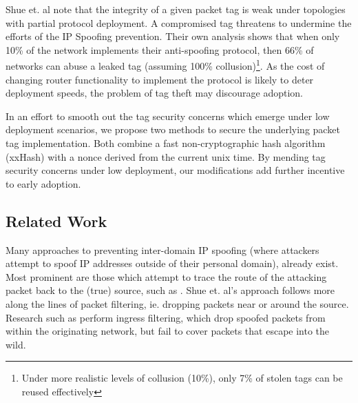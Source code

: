 \documentclass[12pt]{article} %
\begin{document}
Shue et. al note that the integrity of a given packet tag is weak under topologies with partial protocol deployment. A compromised tag threatens to undermine the efforts of the IP Spoofing prevention. Their own analysis shows that when only 10\% of the network implements their anti-spoofing protocol, then 66\% of networks can abuse a leaked tag (assuming 100\% collusion)\cite{Shue20081567}\footnote{Under more realistic levels of collusion (10\%), only 7\% of stolen tags can be reused effectively}. As the cost of changing router functionality to implement the protocol is likely to deter deployment speeds, the problem of tag theft may discourage adoption.

In an effort to smooth out the tag security concerns which emerge under low deployment scenarios, we propose two methods to secure the underlying packet tag implementation. Both combine a fast non-cryptographic hash algorithm (xxHash) with a nonce derived from the current unix time. By mending tag security concerns under low deployment, our modifications add further incentive to early adoption.

\subsection{Related Work}
Many approaches to preventing inter-domain IP spoofing (where attackers attempt to spoof IP addresses outside of their personal domain), already exist. Most prominent are those which attempt to trace the route of the attacking packet back to the (true) source, such as \cite{Taylor}. Shue et. al's approach follows more along the lines of packet filtering, ie. dropping packets near or around the source. Research such as \cite{rfc2827} perform ingress filtering, which drop spoofed packets from within the originating network, but fail to cover packets that escape into the wild.








\end{document}
